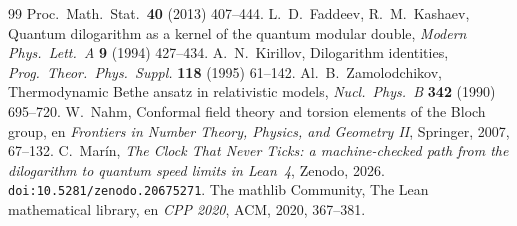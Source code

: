 \documentclass[11pt]{article}
\begin{document}
\begin{thebibliography}{99}
Proc.\ Math.\ Stat.\ \textbf{40} (2013) 407--444.
 L.~D.~Faddeev, R.~M.~Kashaev, Quantum dilogarithm as a kernel of
the quantum modular double, \emph{Modern Phys.\ Lett.\ A} \textbf{9} (1994) 427--434.
 A.~N.~Kirillov, Dilogarithm identities, \emph{Prog.\ Theor.\ Phys.\
Suppl.} \textbf{118} (1995) 61--142.
 Al.~B.~Zamolodchikov, Thermodynamic Bethe ansatz in relativistic
models, \emph{Nucl.\ Phys.\ B} \textbf{342} (1990) 695--720.
 W.~Nahm, Conformal field theory and torsion elements of the Bloch group, en
\emph{Frontiers in Number Theory, Physics, and Geometry II}, Springer, 2007, 67--132.
\bibitem{clock} C.~Mar\'in, \emph{The Clock That Never Ticks: a machine-checked path from
the dilogarithm to quantum speed limits in Lean~4}, Zenodo, 2026.
\texttt{doi:10.5281/zenodo.20675271}.
 The mathlib Community, The Lean mathematical library, en \emph{CPP 2020},
ACM, 2020, 367--381.
\end{thebibliography}
\end{document}
